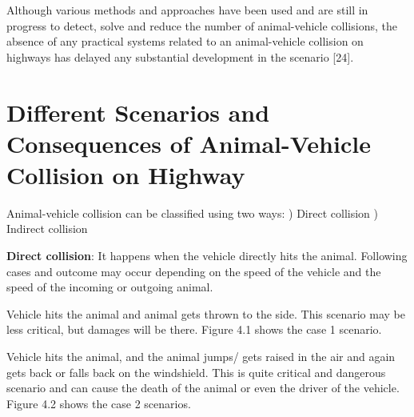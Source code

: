 \documentclass[14pt,a4paper,final]{extreport}
\begin{document}
\item Although various methods and approaches have been used and are still in progress to detect, solve and reduce the number of animal-vehicle collisions, the absence of any practical systems related to an animal-vehicle collision on highways has delayed any substantial development in the scenario [24].

\chapter{Different Scenarios and Consequences of Animal-Vehicle Collision on Highway}
\item Animal-vehicle collision can be classified using two ways:
) Direct collision
) Indirect collision

\item \textbf{Direct collision}: It happens when the vehicle directly hits the animal. Following cases and outcome may occur depending on the speed of the vehicle and the speed of the incoming or outgoing animal.

\item Vehicle hits the animal and animal gets thrown to the side. This scenario may be less critical, but damages will be there. Figure 4.1 shows the case 1 scenario.

\item Vehicle hits the animal, and the animal jumps/ gets raised in the air and again gets back or falls back on the windshield. This is quite critical and dangerous scenario and can cause the death of the animal or even the driver of the vehicle. Figure 4.2 shows the case 2 scenarios.
\end{document}
